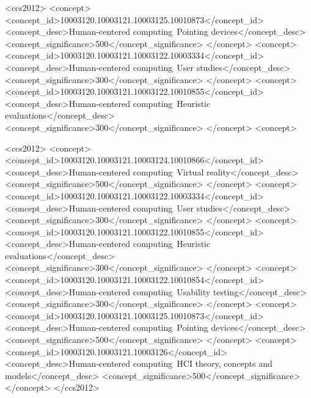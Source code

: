 \documentclass[acmlarge]{acmart}
\begin{document}
\begin{CCSXML}
  <ccs2012>
     <concept>
         <concept_id>10003120.10003121.10003125.10010873</concept_id>
         <concept_desc>Human-centered computing~Pointing devices</concept_desc>
         <concept_significance>500</concept_significance>
         </concept>
     <concept>
         <concept_id>10003120.10003121.10003122.10003334</concept_id>
         <concept_desc>Human-centered computing~User studies</concept_desc>
         <concept_significance>300</concept_significance>
         </concept>
     <concept>
         <concept_id>10003120.10003121.10003122.10010855</concept_id>
         <concept_desc>Human-centered computing~Heuristic evaluations</concept_desc>
         <concept_significance>300</concept_significance>
         </concept>
     <concept>\begin{CCSXML}
      <ccs2012>
         <concept>
             <concept_id>10003120.10003121.10003124.10010866</concept_id>
             <concept_desc>Human-centered computing~Virtual reality</concept_desc>
             <concept_significance>500</concept_significance>
             </concept>
         <concept>
             <concept_id>10003120.10003121.10003122.10003334</concept_id>
             <concept_desc>Human-centered computing~User studies</concept_desc>
             <concept_significance>300</concept_significance>
             </concept>
         <concept>
             <concept_id>10003120.10003121.10003122.10010855</concept_id>
             <concept_desc>Human-centered computing~Heuristic evaluations</concept_desc>
             <concept_significance>300</concept_significance>
             </concept>
         <concept>
             <concept_id>10003120.10003121.10003122.10010854</concept_id>
             <concept_desc>Human-centered computing~Usability testing</concept_desc>
             <concept_significance>300</concept_significance>
             </concept>
         <concept>
             <concept_id>10003120.10003121.10003125.10010873</concept_id>
             <concept_desc>Human-centered computing~Pointing devices</concept_desc>
             <concept_significance>500</concept_significance>
             </concept>
         <concept>
             <concept_id>10003120.10003121.10003126</concept_id>
             <concept_desc>Human-centered computing~HCI theory, concepts and models</concept_desc>
             <concept_significance>500</concept_significance>
             </concept>
       </ccs2012>
      \end{CCSXML}
      

\end{CCSXML}
\end{document}

